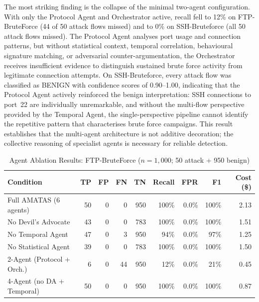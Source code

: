The most striking finding is the collapse of the minimal two-agent configuration. With only the Protocol Agent and Orchestrator active, recall fell to 12\% on FTP-BruteForce (44 of 50 attack flows missed) and to 0\% on SSH-Bruteforce (all 50 attack flows missed). The Protocol Agent analyses port usage and connection patterns, but without statistical context, temporal correlation, behavioural signature matching, or adversarial counter-argumentation, the Orchestrator receives insufficient evidence to distinguish sustained brute force activity from legitimate connection attempts. On SSH-Bruteforce, every attack flow was classified as BENIGN with confidence scores of 0.90--1.00, indicating that the Protocol Agent actively reinforced the benign interpretation: SSH connections to port~22 are individually unremarkable, and without the multi-flow perspective provided by the Temporal Agent, the single-perspective pipeline cannot identify the repetitive pattern that characterises brute force campaigns. This result establishes that the multi-agent architecture is not additive decoration; the collective reasoning of specialist agents is necessary for reliable detection.

\begin{table}[H]
\centering
\caption{Agent Ablation Results: FTP-BruteForce ($n = 1{,}000$; 50 attack + 950 benign)}
\label{tab:ablation-ftp}
\small
\begin{tabular}{@{}l r r r r r r r r@{}}
\toprule
Condition & TP & FP & FN & TN & Recall & FPR & F1 & Cost (\$) \\
\midrule
Full AMATAS (6 agents) & 50 & 0 & 0 & 950 & 100\% & 0.0\% & 100\% & 2.13 \\
No Devil's Advocate & 43 & 0 & 0 & 783 & 100\% & 0.0\% & 100\% & 1.51 \\
No Temporal Agent & 47 & 0 & 3 & 950 & 94\% & 0.0\% & 97\% & 1.25 \\
No Statistical Agent & 39 & 0 & 0 & 783 & 100\% & 0.0\% & 100\% & 1.50 \\
2-Agent (Protocol + Orch.) & 6 & 0 & 44 & 950 & 12\% & 0.0\% & 21\% & 0.45 \\
4-Agent (no DA + Temporal) & 50 & 0 & 0 & 950 & 100\% & 0.0\% & 100\% & 0.87 \\
\bottomrule
\end{tabular}
\end{table}

